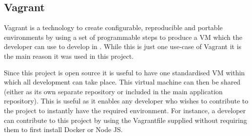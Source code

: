 \subsection{Vagrant}
Vagrant is a technology to create configurable, reproducible and portable environments by using a set of programmable steps to produce a \gls{VM} which the developer can use to develop in \citep{Vagrant2017}. While this is just one use-case of Vagrant it is the main reason it was used in this project. 

Since this project is open source it is useful to have one standardised VM within which all development can take place. This virtual machine can then be shared (either as its own separate repository or included in the main application repository). This is useful as it enables any developer who wishes to contribute to the project to instantly have the required environment. For instance, a developer can contribute to this project by using the \gls{Vagrantfile} supplied without requiring them to first install Docker or Node JS.
